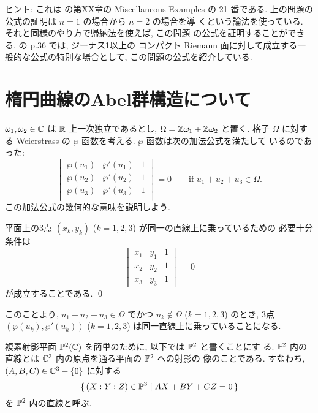 \documentclass[12pt,twoside]{jarticle}
\def\setminus{-}
\def\pe{\wp}
\def\Z{{\Bbb Z}} %
\def\R{{\Bbb R}} %
\def\C{{\Bbb C}} %
\def\P{{\Bbb P}}
\begin{document}
\noindent ヒント: これは \cite{WW}の第XX章の Miscellaneous Examples の 
21 番である. 上の問題の公式の証明は $n=1$ の場合から $n=2$ の場合を導
くという論法を使っている. それと同様のやり方で帰納法を使えば, この問題
の公式を証明することができる. \cite{Fay}の p.36 では, ジーナス1以上の
コンパクト Riemann 面に対して成立する一般的な公式の特別な場合として, 
この問題の公式を紹介している.


\section{楕円曲線のAbel群構造について}


$\omega_1,\omega_2\in\C$ は $\R$ 上一次独立であるとし, %
$\Omega=\Z\omega_1+\Z\omega_2$ と置く. 格子 $\Omega$ に対する 
Weierstrass の $\pe$ 函数を考える. $\pe$ 函数は次の加法公式を満たして
いるのであった: 
$$
  \begin{vmatrix}
    \pe(u_1) & \pe'(u_1) & 1 \\
    \pe(u_2) & \pe'(u_2) & 1 \\
    \pe(u_3) & \pe'(u_3) & 1 \\
  \end{vmatrix}
  = 0
  \qquad
  \text{if $u_1+u_2+u_3\in\Omega$}.
$$
この加法公式の幾何的な意味を説明しよう.

\begin{question}
  平面上の3点 $(x_k,y_k)$ ($k=1,2,3$) が同一の直線上に乗っているための
  必要十分条件は
  \[
  \begin{vmatrix}
    x_1 & y_1 & 1 \\
    x_2 & y_2 & 1 \\
    x_3 & y_3 & 1
  \end{vmatrix}
  = 0
  \]
  が成立することである. \qed
\end{question}

\noindent このことより, $u_1+u_2+u_3\in\Omega$ でかつ %
$u_k\not\in\Omega$ ($k=1,2,3$) のとき, 3点 $(\pe(u_k),\pe'(u_k))$ %
($k=1,2,3$) は同一直線上に乗っていることになる.

\medskip

複素射影平面 $\P^2(\C)$ を簡単のために, 以下では $\P^2$ と書くことにす
る. $\P^2$ 内の直線とは $\C^3$ 内の原点を通る平面の $\P^2$ への射影の
像のことである. すなわち, $(A,B,C)\in\C^3\setminus\{0\}$ に対する
\[
  \{\, (X:Y:Z)\in\P^3
  \mid AX+BY+CZ=0 \,\}
\] %
を $\P^2$ 内の直線と呼ぶ. 
\end{document}
